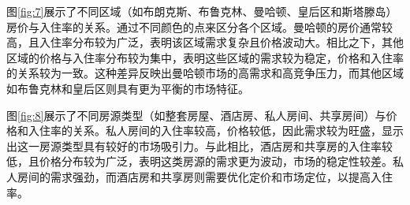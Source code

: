 \documentclass[12pt]{article}
\begin{document}
\begin{CJK}{UTF8}{gbsn}
\begin{figure}[H]
	\end{figure}
	
		图\ref{fig:7}展示了不同区域（如布朗克斯、布鲁克林、曼哈顿、皇后区和斯塔滕岛）房价与入住率的关系。通过不同颜色的点来区分各个区域。曼哈顿的房价通常较高，且入住率分布较为广泛，表明该区域需求复杂且价格波动大。相比之下，其他区域的价格与入住率分布较为集中，表明这些区域的需求较为稳定，价格和入住率的关系较为一致。这种差异反映出曼哈顿市场的高需求和高竞争压力，而其他区域如布鲁克林和皇后区则具有更为平衡的市场特征。
		
		图\ref{fig:8}展示了不同房源类型（如整套房屋、酒店房、私人房间、共享房间）与价格和入住率的关系。私人房间的入住率较高，价格较低，因此需求较为旺盛，显示出这一房源类型具有较好的市场吸引力。与此相比，酒店房和共享房的入住率较低，且价格分布较为广泛，表明这类房源的需求更为波动，市场的稳定性较差。私人房间的需求强劲，而酒店房和共享房则需要优化定价和市场定位，以提高入住率。
		

\end{CJK}
\end{document}
